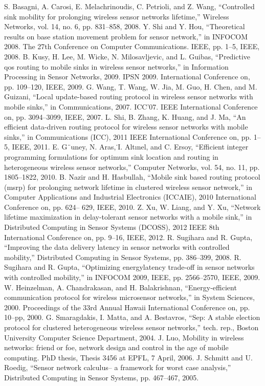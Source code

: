 \documentclass[conference]{IEEEtran}
\begin{document}
\begin{thebibliography}{01}

 S. Basagni, A. Carosi, E. Melachrinoudis, C. Petrioli,
and Z. Wang, “Controlled sink mobility for prolonging
wireless sensor networks lifetime,” Wireless
Networks, vol. 14, no. 6, pp. 831–858, 2008.
 Y. Shi and Y. Hou, “Theoretical results on base
station movement problem for sensor network,” in
INFOCOM 2008. The 27th Conference on Computer
Communications. IEEE, pp. 1–5, IEEE, 2008.
 B. Kusy, H. Lee, M. Wicke, N. Milosavljevic, and
L. Guibas, “Predictive qos routing to mobile sinks in
wireless sensor networks,” in Information Processing
in Sensor Networks, 2009. IPSN 2009. International
Conference on, pp. 109–120, IEEE, 2009.
 G. Wang, T. Wang, W. Jia, M. Guo, H. Chen, and
M. Guizani, “Local update-based routing protocol
in wireless sensor networks with mobile sinks,” in
Communications, 2007. ICC’07. IEEE International
Conference on, pp. 3094–3099, IEEE, 2007.
 L. Shi, B. Zhang, K. Huang, and J. Ma, “An efficient
data-driven routing protocol for wireless sensor networks
with mobile sinks,” in Communications (ICC),
2011 IEEE International Conference on, pp. 1–5,
IEEE, 2011.
 E. G¨uney, N. Aras,˙I. Altınel, and C. Ersoy, “Efficient
integer programming formulations for optimum sink
location and routing in heterogeneous wireless sensor
networks,” Computer Networks, vol. 54, no. 11,
pp. 1805–1822, 2010.
 B. Nazir and H. Hasbullah, “Mobile sink based
routing protocol (msrp) for prolonging network lifetime
in clustered wireless sensor network,” in Computer
Applications and Industrial Electronics (ICCAIE),
2010 International Conference on, pp. 624–
629, IEEE, 2010.
 Z. Xu, W. Liang, and Y. Xu, “Network lifetime
maximization in delay-tolerant sensor networks with
a mobile sink,” in Distributed Computing in Sensor
Systems (DCOSS), 2012 IEEE 8th International Conference
on, pp. 9–16, IEEE, 2012.
 R. Sugihara and R. Gupta, “Improving the data
delivery latency in sensor networks with controlled
mobility,” Distributed Computing in Sensor Systems,
pp. 386–399, 2008.
 R. Sugihara and R. Gupta, “Optimizing energylatency
trade-off in sensor networks with controlled
mobility,” in INFOCOM 2009, IEEE, pp. 2566–2570,
IEEE, 2009.
 W. Heinzelman, A. Chandrakasan, and H. Balakrishnan,
“Energy-efficient communication protocol for
wireless microsensor networks,” in System Sciences,
2000. Proceedings of the 33rd Annual Hawaii International
Conference on, pp. 10–pp, 2000.
 G. Smaragdakis, I. Matta, and A. Bestavros, “Sep: A
stable election protocol for clustered heterogeneous
wireless sensor networks,” tech. rep., Boston University
Computer Science Department, 2004.
 J. Luo, Mobility in wireless networks: friend or foe,
network design and control in the age of mobile
computing. PhD thesis, Thesis 3456 at EPFL, 7 April,
2006.
 J. Schmitt and U. Roedig, “Sensor network calculus–
a framework for worst case analysis,” Distributed
Computing in Sensor Systems, pp. 467–467, 2005.

\end{thebibliography}
\end{document}
